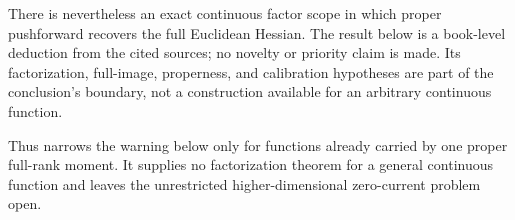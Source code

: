 
There is nevertheless an exact continuous factor scope in which proper
pushforward recovers the full Euclidean Hessian.  The result below is a
book-level deduction from the cited sources; no novelty or priority claim is
made.  Its factorization, full-image, properness, and calibration hypotheses
are part of the conclusion's boundary, not a construction available for an
arbitrary continuous function.




Thus  narrows the warning below only
for functions already carried by one proper full-rank moment.  It supplies no
factorization theorem for a general continuous function and leaves the
unrestricted higher-dimensional zero-current problem open.
